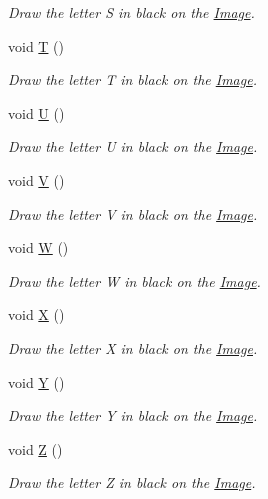 \begin{DoxyCompactItemize}
\begin{DoxyCompactList}\small\item\em Draw the letter S in black on the \mbox{\hyperlink{class_image}{Image}}. \end{DoxyCompactList}\item 
void \mbox{\hyperlink{class_font_v2_a0311eabb37bc231b9b0c0a13cdc0e562}{T}} ()
\begin{DoxyCompactList}\small\item\em Draw the letter T in black on the \mbox{\hyperlink{class_image}{Image}}. \end{DoxyCompactList}\item 
void \mbox{\hyperlink{class_font_v2_a893e649c0fccfae9d99322fe5e333369}{U}} ()
\begin{DoxyCompactList}\small\item\em Draw the letter U in black on the \mbox{\hyperlink{class_image}{Image}}. \end{DoxyCompactList}\item 
void \mbox{\hyperlink{class_font_v2_a58980cf432ef60e1a765b1033da310b4}{V}} ()
\begin{DoxyCompactList}\small\item\em Draw the letter V in black on the \mbox{\hyperlink{class_image}{Image}}. \end{DoxyCompactList}\item 
void \mbox{\hyperlink{class_font_v2_abb6c182459f9a1a20c4d6a85d09b1b1d}{W}} ()
\begin{DoxyCompactList}\small\item\em Draw the letter W in black on the \mbox{\hyperlink{class_image}{Image}}. \end{DoxyCompactList}\item 
void \mbox{\hyperlink{class_font_v2_a63545ba2652b9559d8d171c5bd37fbea}{X}} ()
\begin{DoxyCompactList}\small\item\em Draw the letter X in black on the \mbox{\hyperlink{class_image}{Image}}. \end{DoxyCompactList}\item 
void \mbox{\hyperlink{class_font_v2_a858b25a33231fe1a78539d040e59f0ee}{Y}} ()
\begin{DoxyCompactList}\small\item\em Draw the letter Y in black on the \mbox{\hyperlink{class_image}{Image}}. \end{DoxyCompactList}\item 
void \mbox{\hyperlink{class_font_v2_a9650b871667f1c226d6e0e042f311a51}{Z}} ()
\begin{DoxyCompactList}\small\item\em Draw the letter Z in black on the \mbox{\hyperlink{class_image}{Image}}. \end{DoxyCompactList}\end{DoxyCompactItemize}
